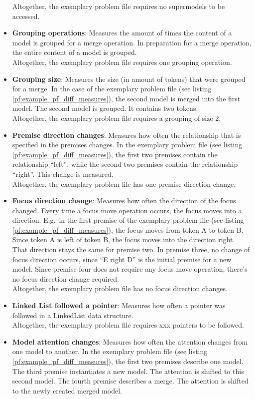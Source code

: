 \documentclass[hidelinks]{scrartcl}
\begin{document}
\begin{itemize}
	Altogether, the exemplary problem file requires no supermodels to be accessed.
	\item \textbf{Grouping operations}: Measures the amount of times the content of a model is grouped for a merge operation. In preparation for a merge operation, the entire content of a model is grouped. \\
	Altogether, the exemplary problem file requires one grouping operation.
	\item \textbf{Grouping size}: Measures the size (in amount of \gls{token}s) that were grouped for a merge. In the case of the exemplary problem file (see listing \ref{pf:example_pf_diff_measures}), the second model is merged into the first model. The second model is grouped. It contains two \gls{token}s. \\
	Altogether, the exemplary problem file requires a grouping of size 2.
	\item \textbf{Premise direction changes}: Measures how often the relationship that is specified in the premises changes. In the exemplary problem file (see listing \ref{pf:example_pf_diff_measures}), the first two \gls{premise}s contain the relationship ``left'', while the second two \gls{premise}s contain the relationship ``right''. This change is measured. \\
	Altogether, the exemplary problem file has one premise direction change.
	\item \textbf{Focus direction change}: Measures how often the direction of the focus changed. Every time a focus move operation occurs, the focus moves into a direction. E.g.\ in the first \gls{premise} of the exemplary problem file (see listing \ref{pf:example_pf_diff_measures}), the focus moves from \gls{token} A to \gls{token} B. Since \gls{token} A is left of \gls{token} B, the focus moves into the direction right. That direction stays the same for \gls{premise} two. In \gls{premise} three, no change of focus direction occurs, since ``E right D'' is the initial \gls{premise} for a new model. Since \gls{premise} four does not require any focus move operation, there's no focus direction change required. \\
	Altogether, the exemplary problem file has no focus direction changes.
	\item \textbf{Linked List followed a pointer}: Measures how often a pointer was followed in a LinkedList data structure. \\
	Altogether, the exemplary problem file requires xxx pointers to be followed.
	\item \textbf{Model attention changes}: Measures how often the attention changes from one model to another. In the exemplary problem file (see listing \ref{pf:example_pf_diff_measures}), the first two \gls{premise}s describe one model. The third \gls{premise} instantiates a new model. The attention is shifted to this second model. The fourth \gls{premise} describes a merge. The attention is shifted to the newly created merged model. \\

\end{itemize}
\end{document}

